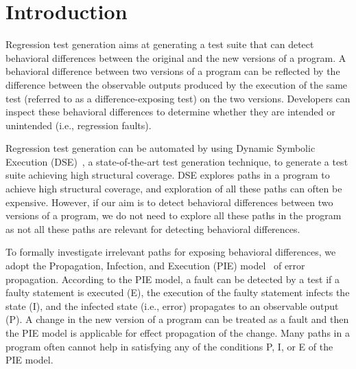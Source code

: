 
\section{Introduction}
\label{sec:intro}
Regression test generation aims at generating a test suite that can detect behavioral differences between the original and the new versions of a program. A behavioral difference between two versions of a program can be reflected by the difference between the observable outputs produced by the execution of the same test (referred to as a difference-exposing test) on the two versions. Developers can inspect these behavioral differences to determine whether they are intended or unintended (i.e., regression faults).

Regression test generation can be automated by using Dynamic Symbolic
Execution (DSE)~\cite{dart, cute, exe}, a state-of-the-art test generation
technique, to generate a test suite achieving high
structural coverage. DSE explores paths in a program to
achieve high structural coverage, and exploration of all
these paths can often be expensive. However, if our aim is
to detect behavioral differences between two versions of a
program, we do not need to explore all these paths in the program
as not all these paths are relevant for detecting behavioral
differences.

To formally investigate irrelevant paths for exposing behavioral differences, we adopt the 
Propagation, Infection, and Execution (PIE) model~\cite{voas} of error propagation. According to the PIE model, a fault can be detected by a test if a faulty statement is executed (E), the execution of the faulty statement infects the state (I), and the infected state (i.e., error) propagates to an observable output (P). A change in the new version of a program can be treated as a fault and then the PIE model is applicable for effect propagation of the change. Many paths in a program often cannot help in satisfying any of the conditions P, I, or E of the PIE model. 

